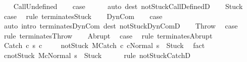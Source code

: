 \begin{isabellebody}
\isamarkupfalse%
\isanewline
\ \ \isamarkupfalse%
\ CallUndefined\isanewline
\ \ \isamarkupfalse%
\ {\isacharquery}case\isanewline
\ \ \ \ \isamarkupfalse%
\ {\isacharparenleft}auto\ dest{\isacharcolon}\ notStuck{\isacharunderscore}CallDefinedD{\isacharparenright}\isanewline
{}\isamarkupfalse%
\isanewline
\ \ \isamarkupfalse%
\ Stuck\ \isamarkupfalse%
\ {\isacharquery}case\ \isamarkupfalse%
\ {\isacharparenleft}rule\ terminates{\isachardot}Stuck{\isacharparenright}\isanewline
{}\isamarkupfalse%
\isanewline
\ \ \isamarkupfalse%
\ DynCom\isanewline
\ \ \isamarkupfalse%
\ {\isacharquery}case\isanewline
\ \ \ \ \isamarkupfalse%
\ {\isacharparenleft}auto\ intro{\isacharcolon}\ terminates{\isachardot}DynCom\ dest{\isacharcolon}\ notStuck{\isacharunderscore}DynComD{\isacharparenright}\isanewline
{}\isamarkupfalse%
\isanewline
\ \ \isamarkupfalse%
\ Throw\ \isamarkupfalse%
\ {\isacharquery}case\ \isamarkupfalse%
\ {\isacharparenleft}rule\ terminates{\isachardot}Throw{\isacharparenright}\isanewline
{}\isamarkupfalse%
\isanewline
\ \ \isamarkupfalse%
\ Abrupt\ \isamarkupfalse%
\ {\isacharquery}case\ \isamarkupfalse%
\ {\isacharparenleft}rule\ terminates{\isachardot}Abrupt{\isacharparenright}\isanewline
{}\isamarkupfalse%
\isanewline
\ \ \isamarkupfalse%
\ {\isacharparenleft}Catch\ c{}\ s\ c{}{\isacharparenright}\ \isanewline
\ \ \isamarkupfalse%
\ not{\isacharunderscore}Stuck{\isacharcolon}\ {\isachardoublequoteopen}{\isasymGamma}{\isacharbar}\isactrlbsub M\isactrlesub {\isasymturnstile}{\isasymlangle}Catch\ c{}\ c{}{\isacharcomma}Normal\ s\ {\isasymrangle}\ {\isasymRightarrow}{\isasymnotin}{\isacharbraceleft}Stuck{\isacharbraceright}{\isachardoublequoteclose}\ \isamarkupfalse%
\ fact\isanewline
\ \ \isamarkupfalse%
\ c{}{\isacharunderscore}notStuck{\isacharcolon}\ {\isachardoublequoteopen}{\isasymGamma}{\isacharbar}\isactrlbsub M\isactrlesub {\isasymturnstile}{\isasymlangle}c{}{\isacharcomma}Normal\ s\ {\isasymrangle}\ {\isasymRightarrow}{\isasymnotin}{\isacharbraceleft}Stuck{\isacharbraceright}{\isachardoublequoteclose}\isanewline
\ \ \ \ \isamarkupfalse%
\ {\isacharparenleft}rule\ notStuck{\isacharunderscore}CatchD{}{\isacharparenright}\isanewline

\end{isabellebody}
